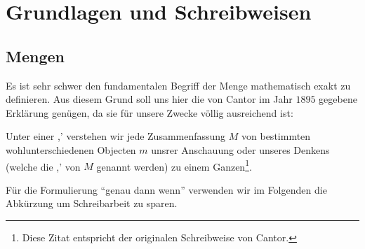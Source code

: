 \section{Grundlagen und Schreibweisen}

\subsection{Mengen}Es ist sehr schwer den fundamentalen Begriff der Menge mathematisch exakt
zu definieren. Aus diesem Grund soll uns hier die von Cantor im Jahr $1895$ gegebene
Erklärung genügen, da sie für unsere Zwecke völlig ausreichend ist:

\begin{definition}
Unter einer ,' verstehen wir jede Zusammenfassung $M$ von 
bestimmten wohlunterschiedenen Objecten $m$ unsrer Anschauung oder 
unseres Denkens (welche die ,' von $M$ genannt werden) zu 
einem Ganzen\footnote{Diese Zitat entspricht der originalen
Schreibweise von Cantor.}. 
\end{definition}

\noindent Für die Formulierung "`genau dann wenn"' verwenden wir im Folgenden
die Abkürzung \gdw{} um Schreibarbeit zu sparen.

